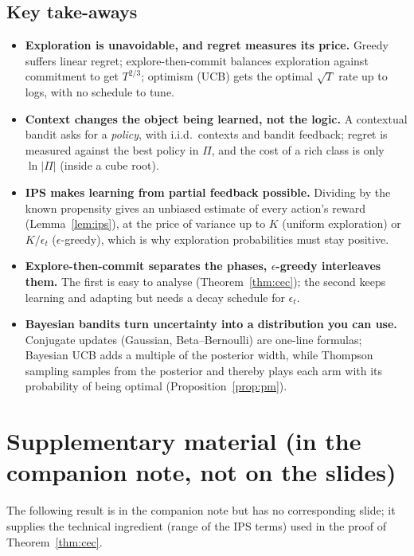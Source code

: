 \documentclass[11pt,a4paper]{article}
\theoremstyle{plain}
\theoremstyle{definition}
\theoremstyle{remark}
\begin{document}
\subsection*{Key take-aways}
\begin{itemize}
 \item \textbf{Exploration is unavoidable, and regret measures its price.} Greedy suffers linear regret; explore-then-commit balances exploration against commitment to get $T^{2/3}$; optimism (UCB) gets the optimal $\sqrt T$ rate up to logs, with no schedule to tune.
 \item \textbf{Context changes the object being learned, not the logic.} A contextual bandit asks for a \emph{policy}, with i.i.d.\ contexts and bandit feedback; regret is measured against the best policy in $\Pi$, and the cost of a rich class is only $\ln|\Pi|$ (inside a cube root).
 \item \textbf{IPS makes learning from partial feedback possible.} Dividing by the known propensity gives an unbiased estimate of every action's reward (Lemma~\ref{lem:ips}), at the price of variance up to $K$ (uniform exploration) or $K/\epsilon_t$ ($\epsilon$-greedy), which is why exploration probabilities must stay positive.
 \item \textbf{Explore-then-commit separates the phases, $\epsilon$-greedy interleaves them.} The first is easy to analyse (Theorem~\ref{thm:cec}); the second keeps learning and adapting but needs a decay schedule for $\epsilon_t$.
 \item \textbf{Bayesian bandits turn uncertainty into a distribution you can use.} Conjugate updates (Gaussian, Beta--Bernoulli) are one-line formulas; Bayesian UCB adds a multiple of the posterior width, while Thompson sampling samples from the posterior and thereby plays each arm with its probability of being optimal (Proposition~\ref{prop:pm}).
\end{itemize}

\appendix
\section{Supplementary material (in the companion note, not on the slides)}\label{app:supp}

The following result is in the companion note but has no corresponding slide; it supplies the technical ingredient (range of the IPS terms) used in the proof of Theorem~\ref{thm:cec}.
\end{document}
